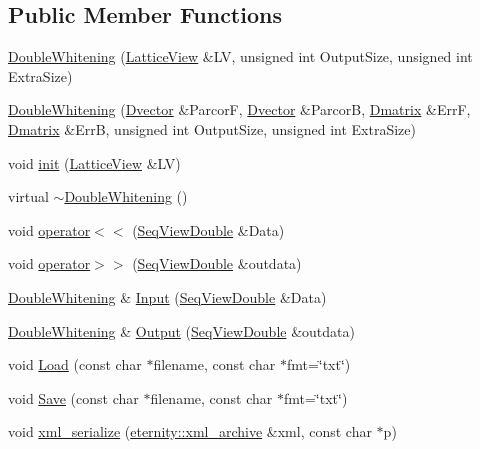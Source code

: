 \subsection*{Public Member Functions}
\begin{DoxyCompactItemize}
\item 
\hyperlink{classtsa_1_1_double_whitening_ae3fdd3dfab61182230994059995ad710}{Double\+Whitening} (\hyperlink{classtsa_1_1_lattice_view}{Lattice\+View} \&LV, unsigned int Output\+Size, unsigned int Extra\+Size)
\item 
\hyperlink{classtsa_1_1_double_whitening_a58092ba19e23ed52e13c8631dd2bd011}{Double\+Whitening} (\hyperlink{namespacetsa_a8900fb03d849baf447a1a0efe2561fb2}{Dvector} \&ParcorF, \hyperlink{namespacetsa_a8900fb03d849baf447a1a0efe2561fb2}{Dvector} \&ParcorB, \hyperlink{namespacetsa_ad260cd21c1891c4ed391fe788569aba4}{Dmatrix} \&ErrF, \hyperlink{namespacetsa_ad260cd21c1891c4ed391fe788569aba4}{Dmatrix} \&ErrB, unsigned int Output\+Size, unsigned int Extra\+Size)
\item 
void \hyperlink{classtsa_1_1_double_whitening_acb49520a47e49872aa817d09b98e0b76}{init} (\hyperlink{classtsa_1_1_lattice_view}{Lattice\+View} \&LV)
\item 
virtual \hyperlink{classtsa_1_1_double_whitening_a313995cfbaec5ed83333b0b63214270b}{$\sim$\+Double\+Whitening} ()
\end{DoxyCompactItemize}
\textbf{ }\par
\begin{DoxyCompactItemize}
\item 
void \hyperlink{classtsa_1_1_double_whitening_a1e445020972445857c2aa175f3460f7e}{operator$<$$<$} (\hyperlink{namespacetsa_ac599574bcc094eda25613724b8f3ca9e}{Seq\+View\+Double} \&Data)
\item 
void \hyperlink{classtsa_1_1_double_whitening_a0dffc968e6aab0ee59cd5aa521913fce}{operator$>$$>$} (\hyperlink{namespacetsa_ac599574bcc094eda25613724b8f3ca9e}{Seq\+View\+Double} \&outdata)
\item 
\hyperlink{classtsa_1_1_double_whitening}{Double\+Whitening} \& \hyperlink{classtsa_1_1_double_whitening_a84c0175991fd9103e3783fbb8e3e1acb}{Input} (\hyperlink{namespacetsa_ac599574bcc094eda25613724b8f3ca9e}{Seq\+View\+Double} \&Data)
\item 
\hyperlink{classtsa_1_1_double_whitening}{Double\+Whitening} \& \hyperlink{classtsa_1_1_double_whitening_a7ad38eb80858187dd73cf9c86e5e9d9b}{Output} (\hyperlink{namespacetsa_ac599574bcc094eda25613724b8f3ca9e}{Seq\+View\+Double} \&outdata)
\item 
void \hyperlink{classtsa_1_1_double_whitening_a81b4fbbc957ce758982cf2b57eb46409}{Load} (const char $\ast$filename, const char $\ast$fmt=\char`\"{}txt\char`\"{})
\item 
void \hyperlink{classtsa_1_1_double_whitening_a1aa0f1d374957545ba734613f97fdfdb}{Save} (const char $\ast$filename, const char $\ast$fmt=\char`\"{}txt\char`\"{})
\item 
void \hyperlink{classtsa_1_1_double_whitening_a3c3577e865e9c733393eba9131712180}{xml\+\_\+serialize} (\hyperlink{classeternity_1_1xml__archive}{eternity\+::xml\+\_\+archive} \&xml, const char $\ast$p)
\end{DoxyCompactItemize}

